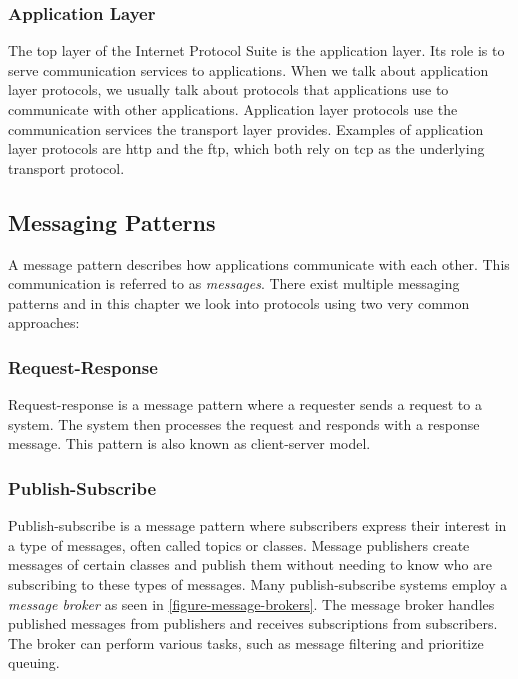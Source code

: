 \subsubsection{Application Layer}

The top layer of the Internet Protocol Suite is the application layer. Its role
is to serve communication services to applications. When we talk about
application layer protocols, we usually talk about protocols that applications
use to communicate with other applications. Application layer protocols use the
communication services the transport layer provides. Examples of application
layer protocols are \gls{http} and the \gls{ftp}, which both rely on \gls{tcp}
as the underlying transport protocol.

\subsection{Messaging Patterns}

A message pattern describes how applications communicate with each other. This
communication is referred to as \textit{messages}. There exist multiple
messaging patterns and in this chapter we look into protocols using two very
common approaches:

\subsubsection{Request-Response}

Request-response is a message pattern where a requester sends a request to a
system. The system then processes the request and responds with a response
message. This pattern is also known as client-server model.

\subsubsection{Publish-Subscribe}

Publish-subscribe is a message pattern where subscribers express their interest
in a type of messages, often called topics or classes. Message publishers create
messages of certain classes and publish them without needing to know who are
subscribing to these types of messages.  Many publish-subscribe systems employ a
\textit{message broker} as seen in \cref{figure-message-brokers}. The message
broker handles published messages from publishers and receives subscriptions
from subscribers. The broker can perform various tasks, such as message
filtering and prioritize queuing.

